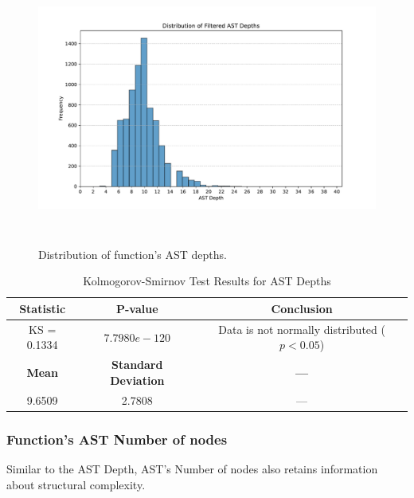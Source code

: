 \documentclass[10pt,english,a4paper]{report}
\begin{document}
\begin{figure}[H]
    \centering
    \includegraphics[width=16cm, height=9cm]{figures/ast_depths_merged.pdf}
    \caption{Distribution of function's AST depths.}
    \label{fig:ast_depths_merged}
\end{figure}

\begin{table}[h!]
    \centering
    \caption{Kolmogorov-Smirnov Test Results for AST Depths}
    \label{tab:kolmogorov_smirnov_depths}
    \begin{tabular}{|c|c|c|}
        \hline
        \textbf{Statistic} & \textbf{P-value} & \textbf{Conclusion} \\
        \hline
        KS = 0.1334 & $7.7980e-120$ & Data is not normally distributed ($p < 0.05$) \\
        \hline
        \textbf{Mean} & \textbf{Standard Deviation} & \textbf{---} \\
        \hline
        9.6509 & 2.7808 & --- \\
        \hline
    \end{tabular}
\end{table}

\subsubsection{Function's AST Number of nodes}

Similar to the AST Depth, AST's Number of nodes also retains information
about structural complexity.
\end{document}

